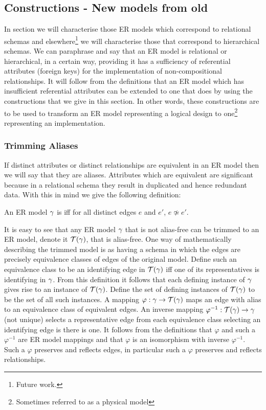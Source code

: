 \subsection{Constructions - New models from old}
In section  we will characterise those ER models which correspond to relational schemas and elsewhere\footnote{Future work.} we will characterise those that correspond to hierarchical schemas. 
We can paraphrase and say that an ER model is relational or hierarchical, in a certain way,  providing it has a sufficiency of referential attributes (foreign keys) for the implementation  of non-compositional relationships. 
It will follow from the definitions  that an ER model which has insufficient referential attributes can be extended to one that does by using the constructions that we give in this section.
In other words, these constructions are to be used to transform an ER model representing a logical design to one\footnote{Sometimes referred to as a physical model} representing an implementation. 
\subsubsection{Trimming Aliases}
If distinct attributes or distinct relationships
are equivalent in an ER model then we will say that they are aliases. Attributes which are equivalent are significant because in a relational schema they result in duplicated and hence redundant data. 
With this in mind we give the following definition:
\begin{definition}
An ER model $\gamma$ is  iff for all distinct edges $e$ and $e'$, $e \not\simeq e'$.
\end{definition}

It is easy to see that any ER model $\gamma$ that is not alias-free can be trimmed to an ER model, denote it $\mathcal{T}(\gamma)$, that is alias-free. 
One way of mathematically describing the trimmed model is as having a schema in which the edges are precisely equivalence classes of edges of the original model. 
Define such an equivalence class to be an identifying edge in $\mathcal{T}(\gamma)$ iff one of its representatives is identifying in $\gamma$.
From this definition it follows that each defining instance of $\gamma$ gives rise to an instance of $\mathcal{T}(\gamma)$. Define the set of defining instances of $\mathcal{T}(\gamma)$ to be the set of all such instances.
A mapping $\varphi: \gamma \rightarrow \mathcal{T}(\gamma)$ maps an edge with alias to an equivalence class of equivalent edges. 
An inverse mapping $\varphi^{-1}: \mathcal{T}(\gamma) \rightarrow \gamma$ (not unique) selects a representative edge from each equivalence class selecting an identifying edge is there is one.
It follows from the definitions that $\varphi$ and such a $\varphi^{-1}$ are ER model mappings and that $\varphi$ is an isomorphism with inverse $\varphi^{-1}$. Such a $\varphi$ preserves and reflects edges, in particular such a $\varphi$
preserves and reflects relationships.


